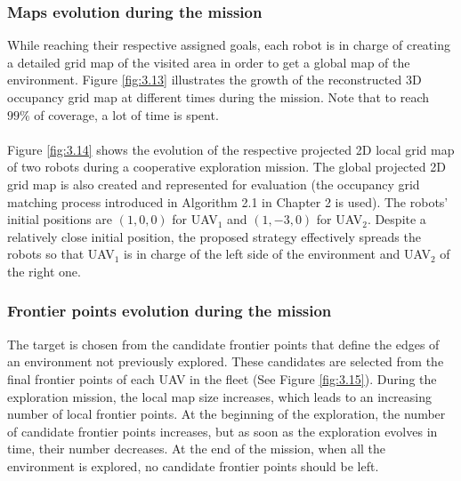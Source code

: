 \documentclass[11pt,openany]{book}
\begin{document}
\subsubsection{Maps evolution during the mission}
While reaching their respective assigned goals, each robot is in charge of creating a detailed grid map of the visited area in order to get a global map of the environment. Figure \ref{fig:3.13} illustrates the growth of the reconstructed 3D occupancy grid map at different times during the mission. Note that to reach $99\%$ of coverage, a lot of time is spent.\\\\
Figure \ref{fig:3.14} shows the evolution of the respective projected 2D local grid map of two robots during a cooperative exploration mission. The global projected 2D grid map is also created and represented for evaluation (the occupancy grid matching process introduced in Algorithm 2.1 in Chapter 2 is used). The robots’ initial positions are $(1,0,0)$ for UAV$_1$ and $(1,-3,0)$ for UAV$_2$. Despite a relatively close initial position, the proposed strategy effectively spreads the robots so that UAV$_1$ is in charge of the left side of the environment and UAV$_2$ of the right one.
\subsubsection{Frontier points evolution during the mission}
The target is chosen from the candidate frontier points that define the edges of an environment not previously explored. These candidates are selected from the final frontier points of each UAV in the ﬂeet (See Figure \ref{fig:3.15}). During the exploration mission, the local map size increases, which leads to an increasing number of local frontier points. At the beginning of the exploration, the number of candidate frontier points increases, but as soon as the exploration evolves in time, their number decreases. At the end of the mission, when all the environment is explored, no candidate frontier points should be left.
\end{document}
